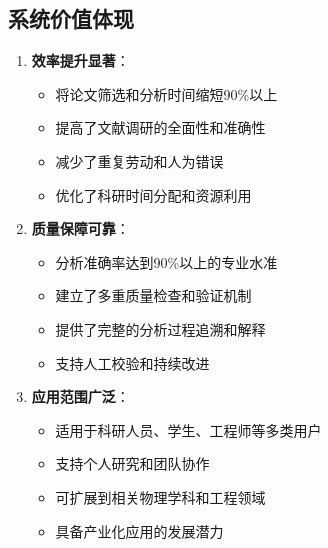 \documentclass[12pt,a4paper]{article}
\begin{document}
\subsection{系统价值体现}
\begin{enumerate}
    \item \textbf{效率提升显著}：
        \begin{itemize}
            \item 将论文筛选和分析时间缩短90\%以上
            \item 提高了文献调研的全面性和准确性
            \item 减少了重复劳动和人为错误
            \item 优化了科研时间分配和资源利用
        \end{itemize}
    
    \item \textbf{质量保障可靠}：
        \begin{itemize}
            \item 分析准确率达到90\%以上的专业水准
            \item 建立了多重质量检查和验证机制
            \item 提供了完整的分析过程追溯和解释
            \item 支持人工校验和持续改进
        \end{itemize}
    
    \item \textbf{应用范围广泛}：
        \begin{itemize}
            \item 适用于科研人员、学生、工程师等多类用户
            \item 支持个人研究和团队协作
            \item 可扩展到相关物理学科和工程领域
            \item 具备产业化应用的发展潜力
        \end{itemize}
\end{enumerate}
\end{document}

